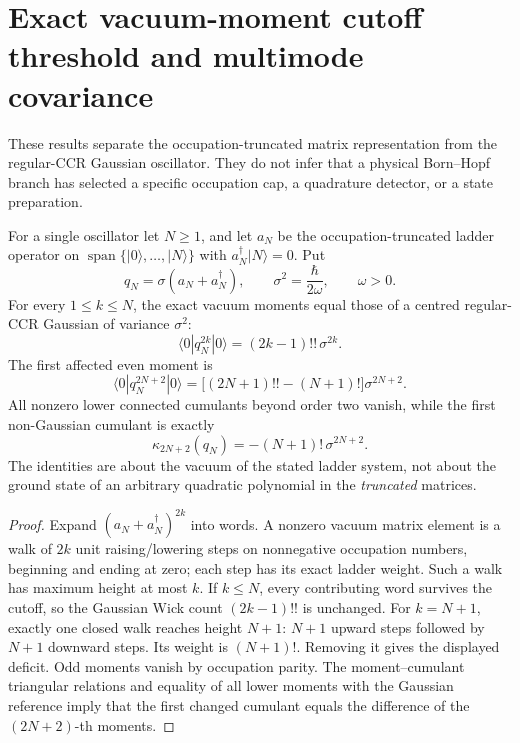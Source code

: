\documentclass[12pt,a4paper]{article}
\begin{document}
\section{Exact vacuum-moment cutoff threshold and multimode covariance}
\label{p4c:sec:v347-cutoff-covariance}
These results separate the occupation-truncated matrix representation
from the regular-CCR Gaussian oscillator.  They do not infer that a
physical Born--Hopf branch has selected a specific occupation cap, a
quadrature detector, or a state preparation.

\begin{theorem}
\label{p4c:thm:v347-first-cutoff-cumulant}
For a single oscillator let \(N\ge1\), and let \(a_N\) be the
occupation-truncated ladder operator on
\(\operatorname{span}\{|0\rangle,\ldots,|N\rangle\}\) with
\(a_N^\dagger|N\rangle=0\).  Put
\[
 q_N=\sigma(a_N+a_N^\dagger),\qquad
 \sigma^2=\frac{\hbar}{2\omega},\qquad \omega>0.
\]
For every \(1\le k\le N\), the exact vacuum moments equal those of a
centred regular-CCR Gaussian of variance \(\sigma^2\):
\begin{equation}\label{p4c:eq:v347-low-cutoff-moments}
 \boxed{\langle0|q_N^{2k}|0\rangle=(2k-1)!!\,\sigma^{2k}.}
\end{equation}
The first affected even moment is
\begin{equation}\label{p4c:eq:v347-first-cutoff-moment}
 \boxed{\langle0|q_N^{2N+2}|0\rangle
 =\big[(2N+1)!!-(N+1)!\big]\sigma^{2N+2}.}
\end{equation}
All nonzero lower connected cumulants beyond order two vanish, while
the first non-Gaussian cumulant is exactly
\begin{equation}\label{p4c:eq:v347-first-cutoff-cumulant}
 \boxed{\kappa_{2N+2}(q_N)=-(N+1)!\,\sigma^{2N+2}.}
\end{equation}
The identities are about the vacuum of the stated ladder system, not
about the ground state of an arbitrary quadratic polynomial in the
\emph{truncated} matrices.
\end{theorem}
\begin{proof}
Expand \((a_N+a_N^\dagger)^{2k}\) into words.  A nonzero vacuum
matrix element is a walk of \(2k\) unit raising/lowering steps on
nonnegative occupation numbers, beginning and ending at zero; each
step has its exact ladder weight.  Such a walk has maximum height
at most \(k\).  If \(k\le N\), every contributing word survives the
cutoff, so the Gaussian Wick count \((2k-1)!!\) is unchanged.
For \(k=N+1\), exactly one closed walk reaches height \(N+1\):
\(N+1\) upward steps followed by \(N+1\) downward steps.  Its
weight is \((N+1)!\).  Removing it gives the displayed deficit.
Odd moments vanish by occupation parity.  The moment--cumulant
triangular relations and equality of all lower moments with the
Gaussian reference imply that the first changed cumulant equals
the difference of the \((2N+2)\)-th moments.
\end{proof}
\end{document}
